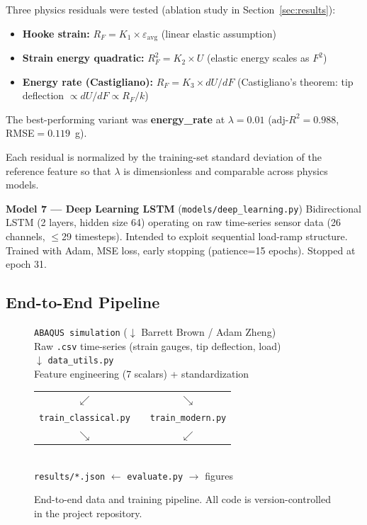 \documentclass[10pt,letterpaper]{article}
\newcommand{\adjRsq}{\text{adj-}R^2}
\begin{document}
Three physics residuals were tested (ablation study in Section~\ref{sec:results}):
\begin{itemize}
  \item \textbf{Hooke strain:} $R_F = K_1 \times \varepsilon_{\text{avg}}$
    (linear elastic assumption)
  \item \textbf{Strain energy quadratic:} $R_F^2 = K_2 \times U$
    (elastic energy scales as $F^2$)
  \item \textbf{Energy rate (Castigliano):} $R_F = K_3 \times dU/dF$
    (Castigliano's theorem: tip deflection $\propto dU/dF \propto R_F/k$)
\end{itemize}

The best-performing variant was \textbf{energy\_rate} at $\lambda = 0.01$
($\adjRsq = 0.988$, RMSE$= 0.119$~g).

Each residual is normalized by the training-set standard deviation of the reference feature
so that $\lambda$ is dimensionless and comparable across physics models.

\textbf{Model 7 --- Deep Learning LSTM} (\texttt{models/deep\_learning.py})
Bidirectional LSTM (2 layers, hidden size 64) operating on raw time-series sensor data
(26 channels, $\leq$29 timesteps). Intended to exploit sequential load-ramp structure.
Trained with Adam, MSE loss, early stopping (patience=15 epochs). Stopped at epoch 31.

\subsection{End-to-End Pipeline}

\begin{figure}[H]
  \centering\small
  \texttt{ABAQUS simulation}
    \quad ($\downarrow$ Barrett Brown / Adam Zheng)\\[3pt]
  Raw \texttt{.csv} time-series (strain gauges, tip deflection, load)\\[3pt]
  $\downarrow$ \quad \texttt{data\_utils.py}\\[3pt]
  Feature engineering (7 scalars) + standardization\\[5pt]
  \begin{tabular}{@{}ccc@{}}
    \small$\swarrow$ & \hspace{2.5cm} & \small$\searrow$ \\[2pt]
    \texttt{train\_classical.py} & & \texttt{train\_modern.py} \\[2pt]
    \small$\searrow$ & \hspace{2.5cm} & \small$\swarrow$ \\
  \end{tabular}\\[3pt]
  \texttt{results/*.json}
    $\longleftarrow$ \texttt{evaluate.py} $\longrightarrow$ figures
  \caption{End-to-end data and training pipeline. All code is version-controlled in the
    project repository.}
  \label{fig:pipeline}
\end{figure}
\end{document}
